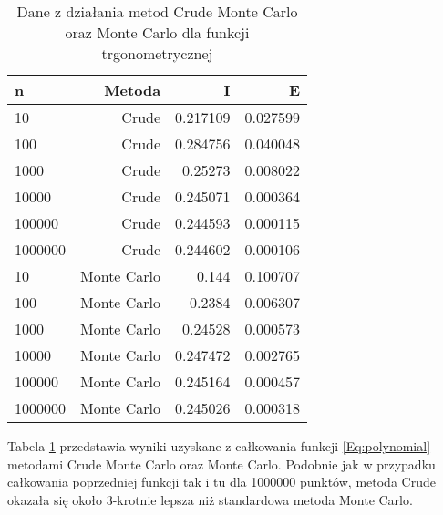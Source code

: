 \documentclass[12pt,twoside]{article}
\begin{document}
\begin{table}[H]
\centering 
\caption{Dane z działania metod Crude Monte Carlo oraz Monte Carlo dla funkcji trgonometrycznej}
\label{tabela9.6}
\begin{tabular}{lrrr}
\toprule
{n} & Metoda &  I &  E \\
\midrule
10  &     Crude & 0.217109  &   0.027599 \\
100  &     Crude & 0.284756 &   0.040048 \\
1000  &    Crude & 0.25273   &   0.008022  \\
10000  &    Crude & 0.245071  &   0.000364  \\
100000  &    Crude & 0.244593 &    0.000115   \\
1000000  &    Crude & 0.244602 &    0.000106   \\
\midrule
10  &     Monte Carlo & 0.144  &   0.100707 \\
100  &     Monte Carlo & 0.2384  &   0.006307 \\
1000  &    Monte Carlo & 0.24528   &   0.000573  \\
10000  &    Monte Carlo & 0.247472  &   0.002765  \\
100000  &    Monte Carlo & 0.245164 &    0.000457   \\
1000000  &    Monte Carlo & 0.245026 &    0.000318   \\
\bottomrule
\end{tabular}
\end{table}


Tabela \ref{tabela9.6} przedstawia wyniki uzyskane z całkowania funkcji \eqref{Eq:polynomial} metodami Crude Monte Carlo oraz Monte Carlo. Podobnie jak w przypadku całkowania poprzedniej funkcji tak i tu dla 1000000 punktów, metoda Crude okazała się  około 3-krotnie lepsza niż standardowa metoda Monte Carlo. 
\end{document}
